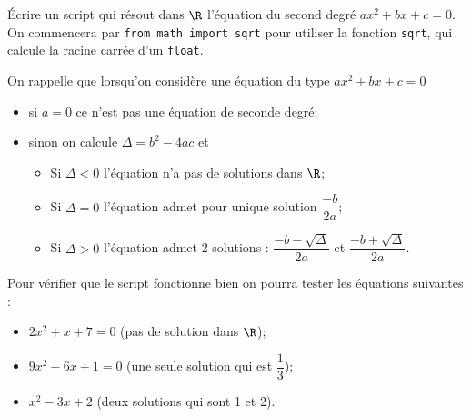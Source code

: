 \begin{exercice}
	\'Ecrire un script qui résout dans $\R$ l'équation du second degré $ax^2+bx+c=0$.\\
	On commencera par \texttt{from math import sqrt} pour utiliser la fonction \texttt{sqrt}, qui calcule la racine carrée d'un \texttt{float}.

	On rappelle que lorsqu'on considère une équation du type $ax^2+bx+c=0$
	\begin{itemize}
		\item   si $a=0$ ce n'est pas une équation de seconde degré;
		\item   sinon on calcule $\Delta = b^2-4ac$ et
		      \begin{itemize}
			      \item   Si $\Delta<0$ l'équation n'a pas de solutions dans $\R$;
			      \item   Si $\Delta=0$ l'équation admet pour unique solution $\dfrac{-b}{2a}$;
			      \item   Si $\Delta>0$ l'équation admet 2 solutions : $\dfrac{-b-\sqrt{\Delta}}{2a}$ et $\dfrac{-b+\sqrt{\Delta}}{2a}$.
		      \end{itemize}
	\end{itemize}
	Pour vérifier que le script fonctionne bien on pourra tester les équations suivantes :
	\begin{itemize}
		\item   $2x^2+x+7=0$ (pas de solution dans $\R$);
		\item   $9x^2-6x+1=0$ (une seule solution qui est $\dfrac{1}{3}$);
		\item   $x^2-3x+2$ (deux solutions qui sont 1 et 2).
	\end{itemize}
\end{exercice}

